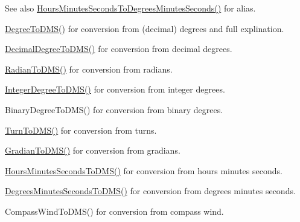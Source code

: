 \begin{DoxySeeAlso}{See also}
\mbox{\hyperlink{group___e_g_x_math-_angle_conversions-_hours_minutes_seconds_gae9eb0acc65dfe6119936f29ac292afaa}{Hours\+Minutes\+Seconds\+To\+Degrees\+Minutes\+Seconds()}} for alias. 

\mbox{\hyperlink{group___e_g_x_math-_angle_conversions-_degree_ga1096d04647918e20f61fb184ba2a7dce}{Degree\+To\+D\+M\+S()}} for conversion from (decimal) degrees and full explination. 

\mbox{\hyperlink{group___e_g_x_math-_angle_conversions-_decimal_degree_ga64a1b298ce16e9edf3209b678a7bed46}{Decimal\+Degree\+To\+D\+M\+S()}} for conversion from decimal degrees. 

\mbox{\hyperlink{group___e_g_x_math-_angle_conversions-_radian_gaf80be0c5c65ccaa5544a08a7754f3575}{Radian\+To\+D\+M\+S()}} for conversion from radians. 

\mbox{\hyperlink{group___e_g_x_math-_angle_conversions-_integer_degree_gaf76779bcc23268b41d4c3a7610d60eaf}{Integer\+Degree\+To\+D\+M\+S()}} for conversion from integer degrees. 

Binary\+Degree\+To\+D\+M\+S() for conversion from binary degrees. 

\mbox{\hyperlink{group___e_g_x_math-_angle_conversions-_turn_ga6ca011c0ae55ae079402080d7a1b4010}{Turn\+To\+D\+M\+S()}} for conversion from turns. 

\mbox{\hyperlink{group___e_g_x_math-_angle_conversions-_gradian_ga0b6700b55ab4a24fa581bf2af0dafdaa}{Gradian\+To\+D\+M\+S()}} for conversion from gradians. 

\mbox{\hyperlink{group___e_g_x_math-_angle_conversions-_hours_minutes_seconds_ga8fe72f56eebb44d7e8d7033476bbdd9b}{Hours\+Minutes\+Seconds\+To\+D\+M\+S()}} for conversion from hours minutes seconds. 

\mbox{\hyperlink{group___e_g_x_math-_angle_conversions-_degrees_minutes_seconds_ga303b21c8ed41a718268bee6346a45be6}{Degrees\+Minutes\+Seconds\+To\+D\+M\+S()}} for conversion from degrees minutes seconds. 

Compass\+Wind\+To\+D\+M\+S() for conversion from compass wind. 
\end{DoxySeeAlso}
\mbox{\label{group___e_g_x_math-_angle_conversions-_hours_minutes_seconds_ga356f1e89c3ea35a9d46967644d4ddfd3}} 

